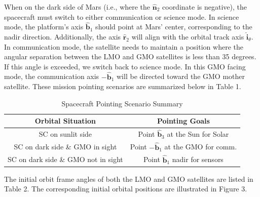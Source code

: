 \documentclass[conf]{new-aiaa}
\begin{document}
When on the dark side of Mars (i.e., where the \( \hat{\bm{n}}_2 \) coordinate is negative), the spacecraft must switch to either communication or science mode. In science mode, the platform’s axis \( \hat{\bm{b}}_1 \) should point at Mars’ center, corresponding to the nadir direction. Additionally, the axis \( \hat{\bm{r}}_2 \) will align with the orbital track axis \( \hat{\bm{i}}_{\theta} \). In communication mode, the satellite needs to maintain a position where the angular separation between the LMO and GMO satellites is less than 35 degrees. If this angle is exceeded, we switch back to science mode. In this GMO facing mode, the communication axis \( -\hat{\bm{b}}_1 \) will be directed toward the GMO mother satellite. These mission pointing scenarios are summarized below in Table 1.

\begin{table}[h]
\centering
\caption{Spacecraft Pointing Scenario Summary}
\begin{tabular}{|c|c|}
\hline
\label{table1}
\textbf{Orbital Situation} & \textbf{Pointing Goals} \\ \hline
SC on sunlit side & Point \( \hat{\bm{b}}_3 \) at the Sun for Solar\\ \hline
SC on dark side \& GMO in sight & Point \( -\hat{\bm{b}}_1 \) at the GMO for comm. \\ \hline
SC on dark side \& GMO not in sight & Point \( \hat{\bm{b}}_1 \) nadir for sensors\\ \hline
\end{tabular}
\end{table}

The initial orbit frame angles of both the LMO and GMO satellites are listed in Table 2. The corresponding initial orbital positions are illustrated in Figure 3.
\end{document}
